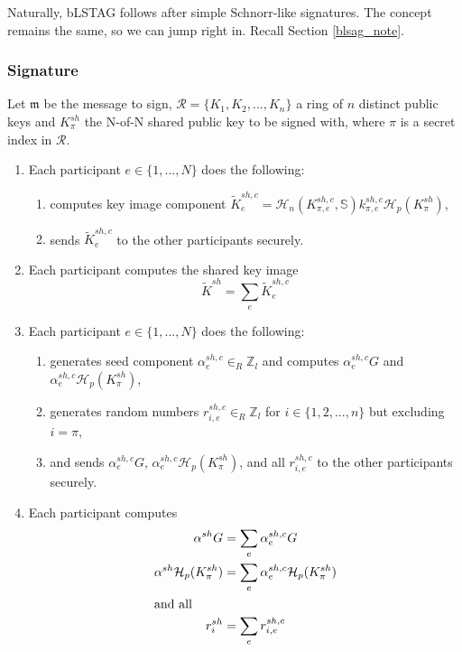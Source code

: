 Naturally, bLSTAG follows after simple Schnorr-like signatures. The concept remains the same, so we can jump right in. Recall Section \ref{blsag_note}.

\subsubsection*{Signature}

Let \(\mathfrak{m}\) be the message to sign, \(\mathcal{R} = \{K_1, K_2, ..., K_n\}\) a ring of $n$ distinct public keys and \(K^{sh}_\pi\)  the N-of-N shared public key to be signed with, where $\pi$ is a secret index in $\mathcal{R}$.

\begin{enumerate}
    \item Each participant $e \in \{1,...,N\}$ does the following:
    \begin{enumerate}
        \item computes key image component $\tilde{K}^{sh,c}_e = \mathcal{H}_n(K^{sh,c}_{\pi,e},\mathbb{S}) k^{sh,c}_{\pi,e} \mathcal{H}_p(K^{sh}_\pi)$,
        \item sends $\tilde{K}^{sh,c}_e$ to the other participants securely.
    \end{enumerate}
    \item Each participant computes the shared key image 
    \[\tilde{K}^{sh} = \sum_e \tilde{K}^{sh,c}_e\]
	
	\item Each participant $e \in \{1,...,N\}$ does the following:
	\begin{enumerate}
	    \item generates seed component $\alpha^{sh,c}_e \in_R \mathbb{Z}_l$ and computes $\alpha^{sh,c}_e G$ and $\alpha^{sh,c}_e \mathcal{H}_p(K^{sh}_\pi)$,
	    \item generates random numbers \(r^{sh,c}_{i,e} \in_R \mathbb{Z}_l\) for \(i \in \{1, 2, ..., n\}\) but excluding \(i = \pi\),
	    \item and sends $\alpha^{sh,c}_e G$, $\alpha^{sh,c}_e \mathcal{H}_p(K^{sh}_\pi)$, and all $r^{sh,c}_{i,e}$ to the other participants securely.
	\end{enumerate}
	\item Each participant computes
	\begin{align*}
	                    \alpha^{sh} G &= \sum_e \alpha^{sh,c}_e G \\
\alpha^{sh} \mathcal{H}_p(K^{sh}_\pi) &= \sum_e \alpha^{sh,c}_e \mathcal{H}_p(K^{sh}_\pi) \\
\intertext{and all }         r^{sh}_i &= \sum_e r^{sh,c}_{i,e}
	\end{align*}
	

\end{enumerate}

